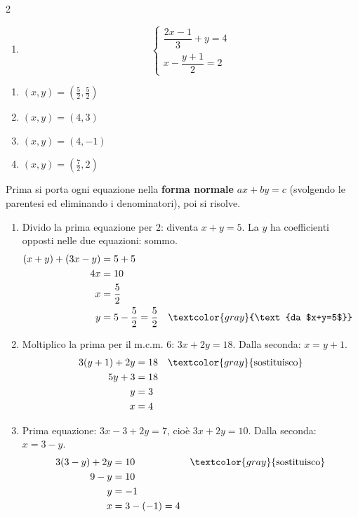\begin{question}[ID=1.3, subtitle={Sistemi lineari con parentesi e frazioni}, difficulty=media, tags={sistemi, equazioni lineari}]
\begin{multicols}{2}
\begin{enumerate}[leftmargin=3.2cm]
    \item
    \[
    \begin{cases}
    \dfrac{2x-1}{3}+y=4\\
    x-\dfrac{y+1}{2}=2
    \end{cases}
    \]
\end{enumerate}
\end{multicols}
\begin{solution}
\begin{enumerate}
    \item $(x,y)=\left(\tfrac52,\tfrac52\right)$
    \item $(x,y)=(4,3)$
    \item $(x,y)=(4,-1)$
    \item $(x,y)=\left(\tfrac72,2\right)$
\end{enumerate}
\end{solution}
\begin{explanation}
Prima si porta ogni equazione nella \textbf{forma normale} $ax+by=c$ (svolgendo le parentesi ed eliminando i denominatori), poi si risolve.
\begin{enumerate}
    \item Divido la prima equazione per $2$: diventa $x+y=5$. La $y$ ha coefficienti opposti nelle due equazioni: sommo.
    \[\begin{aligned}
    (x+y)+(3x-y) &= 5+5\\
    4x &= 10\\
    x &= \dfrac52\\
    y &= 5-\dfrac52=\dfrac52 && \textcolor{gray}{\text{da $x+y=5$}}
    \end{aligned}\]
    \item Moltiplico la prima per il m.c.m. $6$: $3x+2y=18$. Dalla seconda: $x=y+1$.
    \[\begin{aligned}
    3(y+1)+2y &= 18 && \textcolor{gray}{\text{sostituisco}}\\
    5y+3 &= 18\\
    y &= 3\\
    x &= 4
    \end{aligned}\]
    \item Prima equazione: $3x-3+2y=7$, cioè $3x+2y=10$. Dalla seconda: $x=3-y$.
    \[\begin{aligned}
    3(3-y)+2y &= 10 && \textcolor{gray}{\text{sostituisco}}\\
    9-y &= 10\\
    y &= -1\\
    x &= 3-(-1)=4
    \end{aligned}\]

\end{enumerate}
\end{explanation}
\end{question}
